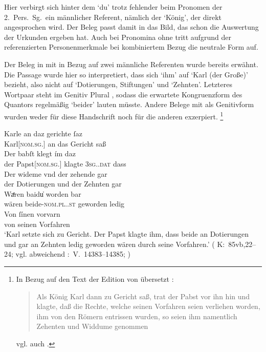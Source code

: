 Hier verbirgt sich hinter dem  `du' trotz fehlender
 beim Pronomen der 2.\ Pers.\ Sg.\ ein männlicher
Referent, nämlich der  `König', der direkt angesprochen wird. Der
Beleg passt damit in das Bild, das schon die Auswertung der Urkunden ergeben
hat. Auch bei Pro\-nomina ohne  tritt aufgrund der
referenzierten Personenmerkmale bei kombiniertem Bezug die neutrale Form auf.

\label{phsec:babstimbaideu}
Der Beleg in  mit  in Bezug auf zwei
männliche Referenten wurde bereits erwähnt. Die Passage wurde hier so
interpretiert, dass sich  `ihm' auf  `Karl (der
Große)' bezieht, also nicht auf  `Dotierungen, Stiftungen'
\autocite[vgl. zur  Definition][s.\,v.~]{lexer:mhdhwb} und
 `Zehnten'. Letzteres Wortpaar steht im Genitiv Plural
\autocite[vgl.][341]{paul2007}, sodass die erwartete Kongruenzform des
Quantors regelmäßig  `beider' lauten müsste. Andere Belege
mit  als Genitivform wurden weder für diese Handschrift noch für
die anderen exzerpiert.%
%
	\footnote{In Bezug auf den Text der Edition von
	\citet{schroeder1895} übersetzt \citet[249]{mayer1874}:
	\blockquote{Als König Karl dann zu Gericht saß, trat der Pabst vor ihn hin
	und klagte, daß die Rechte, welche seinen Vorfahren seien verliehen worden,
	ihm von den Römern entrissen wurden, so seien ihm namentlich Zehenten und
	Widdume genommen}; vgl. auch \citet[83]{weis2022}.}

\begin{exe}
\ex\label{ex:babstimbaideu}
	\gll Karle an daz gerichte ſaz \\
		Karl[\textsc{nom.sg.\MascM}] an das Gericht saß \\
\sn \gll Der babſt klegt ím daz \\
		der Papst[\textsc{nom.sg.\MascM}] klagte \textsc{3sg.\MascM.dat} dass \\
\sn \gll Der wideme vnd der zehende gar \\
		der Dotierungen und der Zehnten gar \\
\sn \gll Waͤren baidu̍ worden bar \\
		wären beide-\textsc{nom.pl.\NeutM.st} geworden ledig \\
\sn \gll Von ſínen vorvarn \\
		von seinen Vorfahren \\
	\trans `Karl setzte sich zu Gericht. Der Papst klagte ihm, dass
		 beide an Dotierungen und gar an Zehnten ledig geworden
		wären durch seine Vorfahren.'
		(%
			K:~85vb,22--24; vgl. abweichend
			\KC:~V.~14383--14385;
			\cite[341]{schroeder1895}%
		)
\end{exe}

